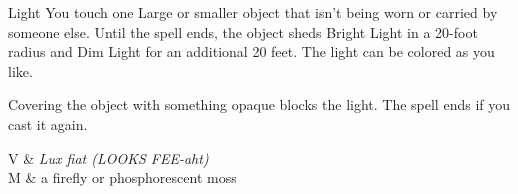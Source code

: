 \begin{Spell}[
  level=Cantrip,
  time=1 Action,
  range=Touch,
  components={V, M},
  duration=1 Hour,
  school=Evocation,
  attack=None,
  effect=Creation
]{Light}
You touch one Large or smaller object that isn't being worn or carried by someone else. Until the spell ends, the object sheds Bright Light in a 20-foot radius and Dim Light for an additional 20 feet. The light can be colored as you like.

Covering the object with something opaque blocks the light. The spell ends if you cast it again.

\begin{components}
V & \textit{Lux fiat (LOOKS FEE-aht)} \\
M & a firefly or phosphorescent moss
\end{components}
\end{Spell}


